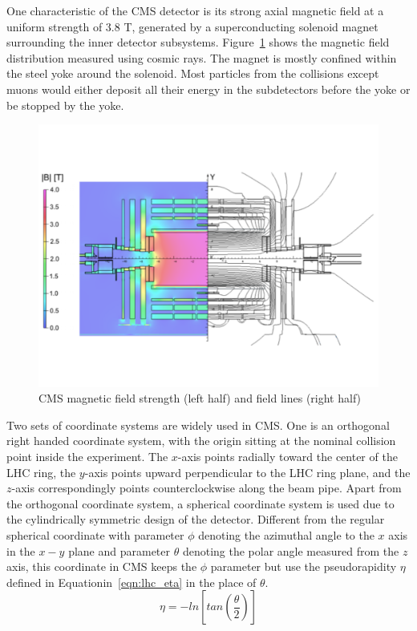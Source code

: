 \vspace{0.3cm}
One characteristic of the CMS detector is its strong axial magnetic field at a uniform strength of 3.8 T, generated by a superconducting solenoid magnet surrounding the inner detector subsystems. Figure~\ref{fig:lhc_magnetdistr} shows the magnetic field distribution measured using cosmic rays\cite{lhc_magnetmap}. The magnet is mostly confined within the steel yoke around the solenoid. Most particles from the collisions except muons would either deposit all their energy in the subdetectors before the yoke or be stopped by the yoke.
\begin{figure}[htbp]
\begin{center}
\includegraphics[width=0.7\linewidth, page=1]{figures/lhc_magnetdistr.pdf}
\caption{CMS magnetic field strength (left half) and field lines (right half)}
\label{fig:lhc_magnetdistr}
\end{center}
\end{figure}

\vspace{0.3cm}
Two sets of coordinate systems are widely used in CMS. One is an orthogonal right handed coordinate system, with the origin sitting at the nominal collision point inside the experiment. The $x$-axis points radially toward the center of the LHC ring, the $y$-axis points upward perpendicular to the LHC ring plane, and the $z$-axis correspondingly points counterclockwise along the beam pipe. Apart from the orthogonal coordinate system, a spherical coordinate system is used due to the cylindrically symmetric design of the detector. Different from the regular spherical coordinate with parameter $\phi$ denoting the azimuthal angle to the $x$ axis in the $x-y$ plane and parameter $\theta$ denoting the polar angle measured from the $z$ axis, this coordinate in CMS keeps the $\phi$ parameter but use the pseudorapidity $\eta$ defined in Equationin~\ref{eqn:lhc_eta} in the place of $\theta$.
\begin{equation}
\eta = -ln[tan(\frac{\theta}{2})]
\label{eqn:lhc_eta}
\end{equation}

